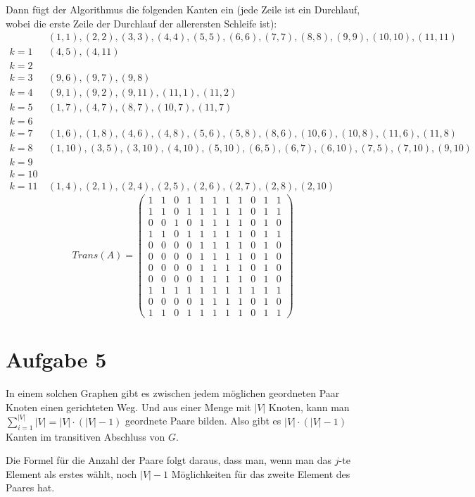 \documentclass[10pt,a4paper]{article}
\begin{document}
Dann fügt der Algorithmus die folgenden Kanten ein (jede Zeile ist ein Durchlauf, wobei die erste Zeile der Durchlauf der allerersten Schleife ist):
\begin{align*}
  & (1, 1), (2, 2), (3, 3), (4, 4), (5, 5), (6, 6), (7, 7), (8, 8), (9, 9), (10, 10), (11, 11)\\
  k = 1\ & (4, 5), (4, 11)\\
  k = 2\ & \\
  k = 3\ & (9, 6), (9, 7), (9, 8)\\
  k = 4\ & (9, 1), (9, 2), (9, 11), (11, 1), (11, 2)\\
  k = 5\ & (1, 7), (4, 7), (8, 7), (10, 7), (11, 7)\\
  k = 6\ & \\
  k = 7\ & (1, 6), (1, 8), (4, 6), (4, 8), (5, 6), (5, 8), (8, 6), (10, 6), (10, 8), (11, 6), (11, 8)\\
  k = 8\ & (1, 10), (3, 5), (3, 10), (4, 10), (5, 10), (6, 5), (6, 7), (6, 10), (7, 5), (7, 10), (9, 10)\\
  k = 9\ &\\
  k = 10\ & \\
  k = 11\ & (1, 4), (2, 1), (2, 4), (2, 5), (2, 6), (2, 7), (2, 8), (2, 10)
\end{align*}
\begin{equation}
  Trans(A) =
  \begin{pmatrix}
    1 & 1 & 0 & 1 & 1 & 1 & 1 & 1 & 0 & 1 & 1\\
    1 & 1 & 0 & 1 & 1 & 1 & 1 & 1 & 0 & 1 & 1\\
    0 & 0 & 1 & 0 & 1 & 1 & 1 & 1 & 0 & 1 & 0\\
    1 & 1 & 0 & 1 & 1 & 1 & 1 & 1 & 0 & 1 & 1\\
    0 & 0 & 0 & 0 & 1 & 1 & 1 & 1 & 0 & 1 & 0\\
    0 & 0 & 0 & 0 & 1 & 1 & 1 & 1 & 0 & 1 & 0\\
    0 & 0 & 0 & 0 & 1 & 1 & 1 & 1 & 0 & 1 & 0\\
    0 & 0 & 0 & 0 & 1 & 1 & 1 & 1 & 0 & 1 & 0\\
    1 & 1 & 1 & 1 & 1 & 1 & 1 & 1 & 1 & 1 & 1\\
    0 & 0 & 0 & 0 & 1 & 1 & 1 & 1 & 0 & 1 & 0\\
    1 & 1 & 0 & 1 & 1 & 1 & 1 & 1 & 0 & 1 & 1
  \end{pmatrix}
\end{equation}

\section{Aufgabe 5}
In einem solchen Graphen gibt es zwischen jedem möglichen geordneten Paar Knoten einen gerichteten Weg.
Und aus einer Menge mit $|V|$ Knoten, kann man $\sum_{i = 1}^{|V|} |V| = |V| \cdot (|V| - 1)$ geordnete Paare bilden.
Also gibt es $|V| \cdot (|V| - 1)$ Kanten im transitiven Abschluss von $G$.

Die Formel für die Anzahl der Paare folgt daraus, dass man, wenn man das $j$-te Element als erstes wählt, noch $|V| - 1$ Möglichkeiten für das zweite Element des Paares hat.
\end{document}
